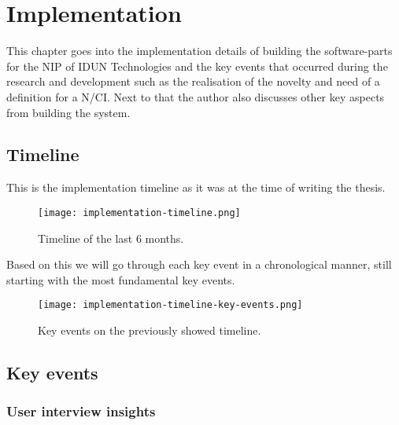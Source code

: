 \chapter{Implementation}
\graphicspath{{Chapter4/Figs/}{Chapter4/Figs/}}

This chapter goes into the implementation details of building the software-parts for the NIP of IDUN Technologies and the key events that occurred during the research and development such as the realisation of the novelty and need of a definition for a N/CI. Next to that the author also discusses other key aspects from building the system.

\section{Timeline}
\label{chapter4-timeline}

This is the implementation timeline as it was at the time of writing the thesis.

\begin{figure}[!ht]
  \centering
  \texttt{[image: implementation-timeline.png]}
  \caption{Timeline of the last 6 months.}
  \label{fig:implementation-timeline}
\end{figure}

Based on this we will go through each key event in a chronological manner, still starting with the most fundamental key events.

\begin{figure}[!ht]
  \centering
  \texttt{[image: implementation-timeline-key-events.png]}
  \caption{Key events on the previously showed timeline.}
  \label{fig:implementation-timeline-key-events}
\end{figure}


\section{Key events}
\label{chapter4-key-events}

\subsection{User interview insights}
\label{chapter4-user-interview-insights}

